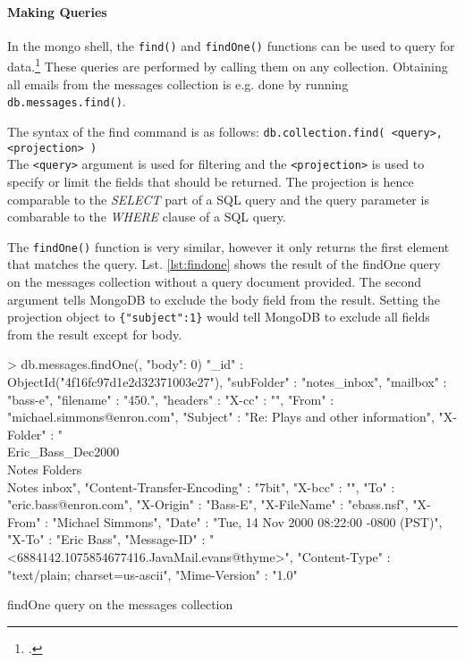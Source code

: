 \paragraph{Making Queries}
In the mongo shell, the \texttt{find()} and \texttt{findOne()} functions can be used to
query for data.\footcite[Cf.][7]{mongo_crud_manual}
These queries are performed by calling them on any collection.
Obtaining all emails from the messages collection is e.g. done by running
\texttt{db.messages.find()}.

The syntax of the find command is as follows: \texttt{db.collection.find(
<query>, <projection> )}\\
The \texttt{<query>} argument is used for filtering and the \texttt{<projection>} is used to specify
or limit the fields that should be returned.
The projection is hence comparable to the \textit{SELECT} part of a SQL query and the
query parameter is combarable to the \textit{WHERE} clause of a SQL query.


The \texttt{findOne()} function is very similar, however it only returns the first
element that matches the query. Lst. \ref{lst:findone} shows the result of the
findOne query on the messages collection without a query document provided. The
second argument tells MongoDB to exclude the body field from the result. Setting
the projection object to \texttt{\{"subject":1\}} would tell MongoDB to exclude
all fields from the result except for body.

\begin{listing}
    \begin{javascriptcode}
> db.messages.findOne({}, {"body": 0})
{
    "_id" : ObjectId("4f16fc97d1e2d32371003e27"),
    "subFolder" : "notes_inbox",
    "mailbox" : "bass-e",
    "filename" : "450.",
    "headers" : {
        "X-cc" : "",
        "From" : "michael.simmons@enron.com",
        "Subject" : "Re: Plays and other information",
        "X-Folder" : "\\Eric_Bass_Dec2000\\Notes Folders\\Notes inbox",
        "Content-Transfer-Encoding" : "7bit",
        "X-bcc" : "",
        "To" : "eric.bass@enron.com",
        "X-Origin" : "Bass-E",
        "X-FileName" : "ebass.nsf",
        "X-From" : "Michael Simmons",
        "Date" : "Tue, 14 Nov 2000 08:22:00 -0800 (PST)",
        "X-To" : "Eric Bass",
        "Message-ID" : "<6884142.1075854677416.JavaMail.evans@thyme>",
        "Content-Type" : "text/plain; charset=us-ascii",
        "Mime-Version" : "1.0"
    }
}
    \end{javascriptcode}
    \caption{findOne query on the messages collection}
    \label{lst:findone}
\end{listing}

